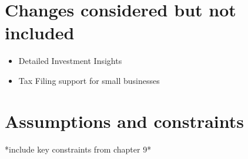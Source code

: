 \section{Changes considered but not included}
\begin{itemize}
    \item Detailed Investment Insights 
    \item Tax Filing support for small businesses 
\end{itemize}


\section{Assumptions and constraints}

*include key constraints from chapter 9* 
